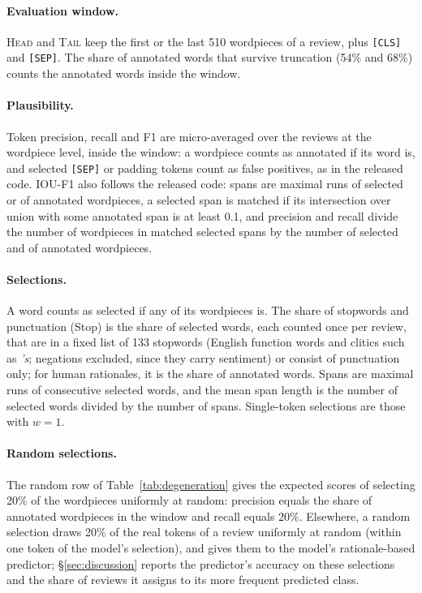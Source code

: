 \documentclass[11pt]{article}
\newcommand{\HEAD}{\textup{\textsc{Head}}}
\newcommand{\TAIL}{\textup{\textsc{Tail}}}
\begin{document}
\paragraph{Evaluation window.} \HEAD{} and \TAIL{} keep the first or the last 510 wordpieces of a review, plus \texttt{[CLS]} and \texttt{[SEP]}. The share of annotated words that survive truncation (54\% and 68\%) counts the annotated words inside the window.

\paragraph{Plausibility.} Token precision, recall and F1 are micro-averaged over the reviews at the wordpiece level, inside the window: a wordpiece counts as annotated if its word is, and selected \texttt{[SEP]} or padding tokens count as false positives, as in the released code. IOU-F1 also follows the released code: spans are maximal runs of selected or of annotated wordpieces, a selected span is matched if its intersection over union with some annotated span is at least 0.1, and precision and recall divide the number of wordpieces in matched selected spans by the number of selected and of annotated wordpieces.

\paragraph{Selections.} A word counts as selected if any of its wordpieces is. The share of stopwords and punctuation (Stop) is the share of selected words, each counted once per review, that are in a fixed list of 133 stopwords (English function words and clitics such as \emph{'s}; negations excluded, since they carry sentiment) or consist of punctuation only; for human rationales, it is the share of annotated words. Spans are maximal runs of consecutive selected words, and the mean span length is the number of selected words divided by the number of spans. Single-token selections are those with $w = 1$.

\paragraph{Random selections.} The random row of Table~\ref{tab:degeneration} gives the expected scores of selecting 20\% of the wordpieces uniformly at random: precision equals the share of annotated wordpieces in the window and recall equals 20\%. Elsewhere, a random selection draws 20\% of the real tokens of a review uniformly at random (within one token of the model's selection), and gives them to the model's rationale-based predictor; \S\ref{sec:discussion} reports the predictor's accuracy on these selections and the share of reviews it assigns to its more frequent predicted class.
\end{document}
